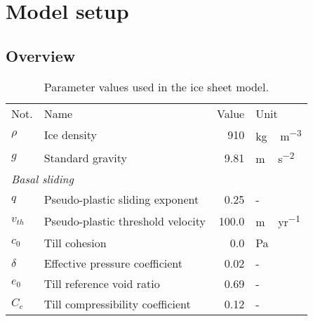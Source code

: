 \documentclass[tc]{copernicus}
\begin{document}
\section{Model setup}
\label{sec:model}

\subsection{Overview}
\label{sec:overview}

\begin{table*}
  \centering
  \caption{Parameter values used in the ice sheet model.}
  \label{tab:params}
  {\begin{tabular}{llrl}
    \tophline
    Not.    & Name & Value & Unit \\
    \middlehline

    $\rho$  & Ice density
            & 910
            & \unit{kg\,m^{-3}} \\

    $g$     & Standard gravity
            & 9.81
            & \unit{m\,s^{-2}} \\

    \multicolumn{2}{l}{\emph{Basal sliding}} \\

    $q$     & Pseudo-plastic sliding exponent
            & 0.25
            & - \\

    $v_{th}$& Pseudo-plastic threshold velocity
            & 100.0
            & \unit{m\,yr^{-1}} \\

    $c_0$   & Till cohesion
            & 0.0
            & Pa \\

    $\delta$& Effective pressure coefficient
            & 0.02
            & - \\

    $e_0$   & Till reference void ratio
            & 0.69
            & - \\

    $C_c$   & Till compressibility coefficient
            & 0.12
            & - \\


\end{tabular}}
\end{table*}
\end{document}
